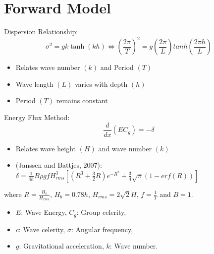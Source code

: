 \documentclass{amsart}
\numberwithin{equation}{section}
\begin{document}
 \section{Forward Model}
Dispersion Relationship:
$$ \sigma^2=gk\tanh(kh) \Longleftrightarrow \left(\frac{2\pi}{T}\right)^2 = g\left(\frac{2\pi}{L}\right) tanh \left(\frac{2\pi h}{L}\right)
$$
\begin{itemize}
\item Relates wave number $(k)$ and Period $(T)$
\item Wave length $(L)$ varies with depth $(h)$
\item Period $(T)$ remains constant
\end{itemize}

Energy Flux Method:
$$\frac{d}{dx}\left(EC_g\right)=-\delta $$
\begin{itemize}
\item Relates wave height $(H)$ and wave number $(k)$
\item (Janssen and Battjes, 2007): $\delta = \frac{1}{4h}B\rho g f H^3_{rms}\left[(R^3+\frac{3}{2}R)e^{-R^2}+\frac{3}{4}\sqrt{\pi}(1-erf(R))\right]$
\end{itemize}
where $R=\frac{H_b}{H_{rms}}$, $H_b=0.78h$, $H_{rms}=2\sqrt{2}H$, $f= \frac{1}{T}$ and $B=1$.
\begin{itemize}
\item $E$: Wave Energy,  $C_{g}$: Group celerity,
\item $c$: Wave celerity, $\sigma$: Angular frequency,
\item $g$: Gravitational acceleration, $k$: Wave number.
\end{itemize}
\end{document}

